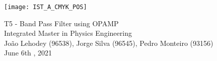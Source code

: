 
\thispagestyle {empty}

\texttt{[image: IST\_A\_CMYK\_POS]}

\begin{center}
%
\vspace{1.0cm}

\vspace{1cm}
{\FontLb T5 - Band Pass Filter using OPAMP} \\ %
\vspace{1cm}
{\FontSn Integrated Master in Physics Engineering} \\ %
\vspace{1cm}
{\FontSn João Lehodey (96538), Jorge Silva (96545), Pedro Monteiro (93156)} \\
\vspace{1cm}
{\FontSn June 6th , 2021} \\ %
%
\end{center}

